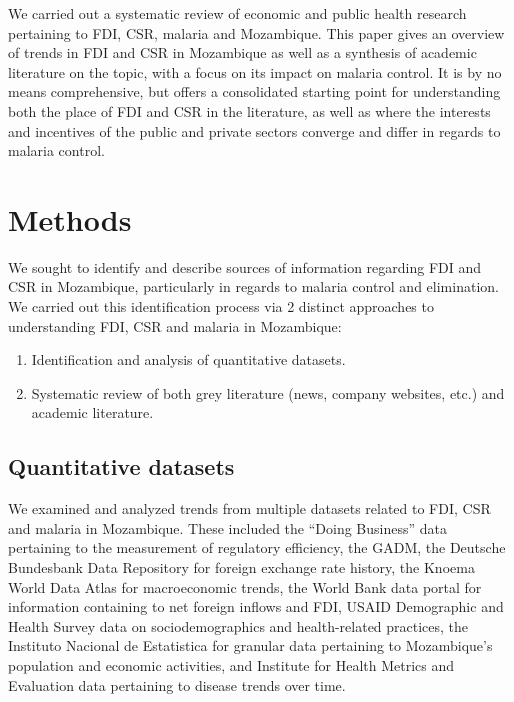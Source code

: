 \documentclass[]{elsarticle} %
\providecommand{\tightlist}{%
  \setlength{\itemsep}{0pt}\setlength{\parskip}{0pt}}
\begin{document}
We carried out a systematic review of economic and public health
research pertaining to FDI, CSR, malaria and Mozambique. This paper
gives an overview of trends in FDI and CSR in Mozambique as well as a
synthesis of academic literature on the topic, with a focus on its
impact on malaria control. It is by no means comprehensive, but offers a
consolidated starting point for understanding both the place of FDI and
CSR in the literature, as well as where the interests and incentives of
the public and private sectors converge and differ in regards to malaria
control.

\section{Methods}\label{methods}

We sought to identify and describe sources of information regarding FDI
and CSR in Mozambique, particularly in regards to malaria control and
elimination. We carried out this identification process via 2 distinct
approaches to understanding FDI, CSR and malaria in Mozambique:

\begin{enumerate}
\def\labelenumi{\arabic{enumi}.}
\tightlist
\item
  Identification and analysis of quantitative datasets.
\item
  Systematic review of both grey literature (news, company websites,
  etc.) and academic literature.
\end{enumerate}

\subsection{Quantitative datasets}\label{quantitative-datasets}

We examined and analyzed trends from multiple datasets related to FDI,
CSR and malaria in Mozambique. These included the ``Doing Business''
data pertaining to the measurement of regulatory efficiency, the GADM,
the Deutsche Bundesbank Data Repository for foreign exchange rate
history, the Knoema World Data Atlas for macroeconomic trends, the World
Bank data portal for information containing to net foreign inflows and
FDI, USAID Demographic and Health Survey data on sociodemographics and
health-related practices, the Instituto Nacional de Estatistica for
granular data pertaining to Mozambique's population and economic
activities, and Institute for Health Metrics and Evaluation data
pertaining to disease trends over time.
\end{document}
